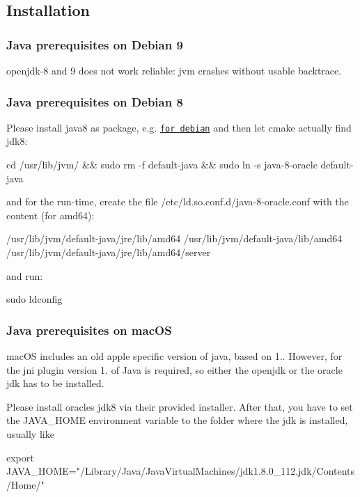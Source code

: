 \subsection*{Installation}

\subsubsection*{Java prerequisites on Debian 9}

openjdk-\/8 and 9 does not work reliable\+: jvm crashes without usable backtrace.

\subsubsection*{Java prerequisites on Debian 8}

Please install java8 as package, e.\+g. \href{http://www.webupd8.org/2014/03/how-to-install-oracle-java-8-in-debian.html}{\tt for debian} and then let cmake actually find jdk8\+: \begin{DoxyVerb}cd /usr/lib/jvm/ && sudo rm -f default-java && sudo ln -s java-8-oracle default-java
\end{DoxyVerb}


and for the run-\/time, create the file {\ttfamily /etc/ld.so.\+conf.\+d/java-\/8-\/oracle.conf} with the content (for amd64)\+: \begin{DoxyVerb}/usr/lib/jvm/default-java/jre/lib/amd64
/usr/lib/jvm/default-java/lib/amd64
/usr/lib/jvm/default-java/jre/lib/amd64/server
\end{DoxyVerb}


and run\+: \begin{DoxyVerb}sudo ldconfig
\end{DoxyVerb}


\subsubsection*{Java prerequisites on mac\+OS}

mac\+OS includes an old apple specific version of java, based on 1.. However, for the jni plugin version 1. of Java is required, so either the openjdk or the oracle jdk has to be installed.

Please install oracle\textquotesingle{}s jdk8 via their provided installer. After that, you have to set the J\+A\+V\+A\+\_\+\+H\+O\+ME environment variable to the folder where the jdk is installed, usually like \begin{DoxyVerb}    export JAVA_HOME="/Library/Java/JavaVirtualMachines/jdk1.8.0_112.jdk/Contents/Home/"
\end{DoxyVerb}


